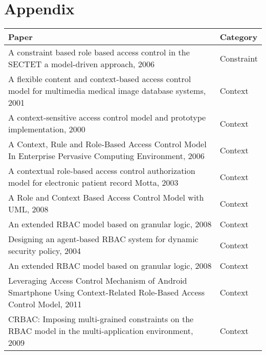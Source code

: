 \section{Appendix} \label{sec:appendix}

\begin{table}
\centering
\begin{tabular}{|p{12.5cm}|p{3cm}|}
\hline
\textbf{Paper} & \textbf{Category}
\\\hline
A constraint based role based access control in the SECTET a model-driven approach, 2006 \cite{alam06:constraint} & Constraint \\\hline

A flexible content and context-based access control model for multimedia medical image database systems, 2001 \cite{tzelepi01:flexible} & Context \\\hline

A context-sensitive access control model and prototype implementation, 2000 \cite{cholewka00:acontext-sensitive} & Context \\\hline

A Context, Rule and Role-Based Access Control Model In Enterprise Pervasive Computing Environment, 2006 \cite{huang06:pervasive} & Context \\\hline

A contextual role-based access control authorization model for electronic patient record Motta, 2003 \cite{motta03:contextual} & Context \\\hline

A Role and Context Based Access Control Model with UML, 2008 \cite{bao08:role} & Context \\\hline

An extended RBAC model based on granular logic, 2008 \cite{jian2008extended} & Context \\\hline

Designing an agent-based RBAC system for dynamic security policy, 2004 \cite{yamazaki104:designing} & Context \\\hline

An extended RBAC model based on granular logic, 2008 \cite{han08:extended} & Context \\\hline

Leveraging Access Control Mechanism of Android Smartphone Using Context-Related Role-Based Access Control Model, 2011 \cite{thein2011leveraging} & Context \\\hline

CRBAC: Imposing multi-grained constraints on the RBAC model in the multi-application environment, 2009 \cite{zou2009crbac} & Context \\\hline


\end{tabular}
\end{table}
